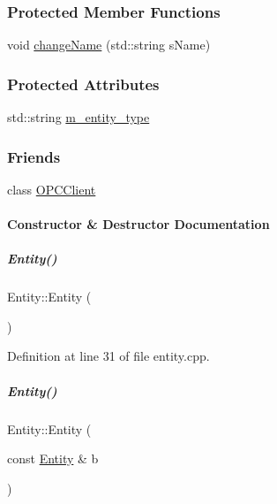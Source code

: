 \subsubsection*{Protected Member Functions}
\begin{DoxyCompactItemize}
\item 
void \hyperlink{group__icubclient__representations_a6dee4e872381a74a59d35f5f72710364}{change\+Name} (std\+::string s\+Name)
\end{DoxyCompactItemize}
\subsubsection*{Protected Attributes}
\begin{DoxyCompactItemize}
\item 
std\+::string \hyperlink{group__icubclient__representations_a4e8debb6585287440c3e04d07628ee36}{m\+\_\+entity\+\_\+type}
\end{DoxyCompactItemize}
\subsubsection*{Friends}
\begin{DoxyCompactItemize}
\item 
class \hyperlink{group__icubclient__representations_a80f0caa9925206967111a3d2713874a2}{O\+P\+C\+Client}
\end{DoxyCompactItemize}


\paragraph{Constructor \& Destructor Documentation}
\mbox{\label{group__icubclient__representations_a980f368aa07ce358583982821533a54a}} 
\subparagraph{\texorpdfstring{Entity()}{Entity()}\hspace{0.1cm}{\footnotesize\ttfamily [1/3]}}
{\footnotesize\ttfamily Entity\+::\+Entity (\begin{DoxyParamCaption}{ }\end{DoxyParamCaption})}



Definition at line 31 of file entity.\+cpp.

\mbox{\label{group__icubclient__representations_a102a6356e68520823918424453f89dd1}} 
\subparagraph{\texorpdfstring{Entity()}{Entity()}\hspace{0.1cm}{\footnotesize\ttfamily [2/3]}}
{\footnotesize\ttfamily Entity\+::\+Entity (\begin{DoxyParamCaption}\item[{const \hyperlink{group__icubclient__representations_classicubclient_1_1Entity}{Entity} \&}]{b }\end{DoxyParamCaption})}



